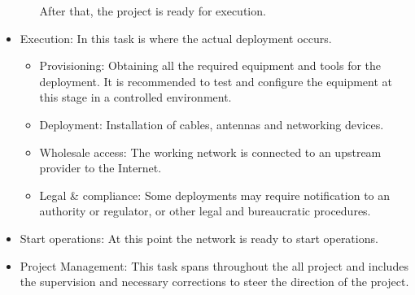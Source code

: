 \documentclass[conference]{IEEEtran}
\begin{document}
\begin{itemize}
\begin{itemize}
    After that, the project is ready for execution.
  \end{itemize}
  \item{Execution:}
  In this task is where the actual deployment occurs.
  \begin{itemize}
    \item{Provisioning:}
    Obtaining all the required equipment and tools for the deployment.
    It is recommended to test and configure the equipment at this stage in a controlled environment.
    \item{Deployment:}
    Installation of cables, antennas and networking devices.
    \item{Wholesale access:}
    The working network is connected to an upstream provider to the Internet.
    \item{Legal \& compliance:}
    Some deployments may require notification to an authority or regulator, or other legal and bureaucratic procedures.
  \end{itemize}
  \item{Start operations:}
  At this point the network is ready to start operations.
  \item{Project Management:}
  This task spans throughout the all project and includes the supervision and necessary corrections to steer the direction of the project.
\end{itemize}



%
%
\end{document}
